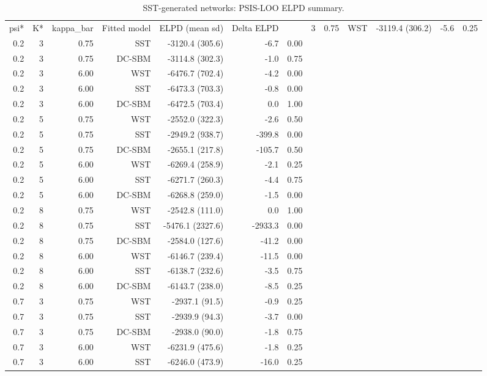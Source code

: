 \begin{table}[!h]
\centering
\caption{SST-generated networks: PSIS-LOO ELPD summary.\\\label{tab:elpd-sst-full-simulation-crossfit-final-DemoKvar-run-20260224-155823}}
\centering
\begin{tabular}[t]{rrrrrrr}
\toprule
psi* & K* & kappa_bar & Fitted model & ELPD (mean sd) & Delta ELPD & %
 & 3 & 0.75 & WST & -3119.4 (306.2) & -5.6 & 0.25\\
0.2 & 3 & 0.75 & SST & -3120.4 (305.6) & -6.7 & 0.00\\
0.2 & 3 & 0.75 & DC-SBM & -3114.8 (302.3) & -1.0 & 0.75\\
0.2 & 3 & 6.00 & WST & -6476.7 (702.4) & -4.2 & 0.00\\
0.2 & 3 & 6.00 & SST & -6473.3 (703.3) & -0.8 & 0.00\\
0.2 & 3 & 6.00 & DC-SBM & -6472.5 (703.4) & 0.0 & 1.00\\
0.2 & 5 & 0.75 & WST & -2552.0 (322.3) & -2.6 & 0.50\\
0.2 & 5 & 0.75 & SST & -2949.2 (938.7) & -399.8 & 0.00\\
0.2 & 5 & 0.75 & DC-SBM & -2655.1 (217.8) & -105.7 & 0.50\\
0.2 & 5 & 6.00 & WST & -6269.4 (258.9) & -2.1 & 0.25\\
0.2 & 5 & 6.00 & SST & -6271.7 (260.3) & -4.4 & 0.75\\
0.2 & 5 & 6.00 & DC-SBM & -6268.8 (259.0) & -1.5 & 0.00\\
0.2 & 8 & 0.75 & WST & -2542.8 (111.0) & 0.0 & 1.00\\
0.2 & 8 & 0.75 & SST & -5476.1 (2327.6) & -2933.3 & 0.00\\
0.2 & 8 & 0.75 & DC-SBM & -2584.0 (127.6) & -41.2 & 0.00\\
0.2 & 8 & 6.00 & WST & -6146.7 (239.4) & -11.5 & 0.00\\
0.2 & 8 & 6.00 & SST & -6138.7 (232.6) & -3.5 & 0.75\\
0.2 & 8 & 6.00 & DC-SBM & -6143.7 (238.0) & -8.5 & 0.25\\
0.7 & 3 & 0.75 & WST & -2937.1 (91.5) & -0.9 & 0.25\\
0.7 & 3 & 0.75 & SST & -2939.9 (94.3) & -3.7 & 0.00\\
0.7 & 3 & 0.75 & DC-SBM & -2938.0 (90.0) & -1.8 & 0.75\\
0.7 & 3 & 6.00 & WST & -6231.9 (475.6) & -1.8 & 0.25\\
0.7 & 3 & 6.00 & SST & -6246.0 (473.9) & -16.0 & 0.25\\

\end{tabular}
\end{table}
